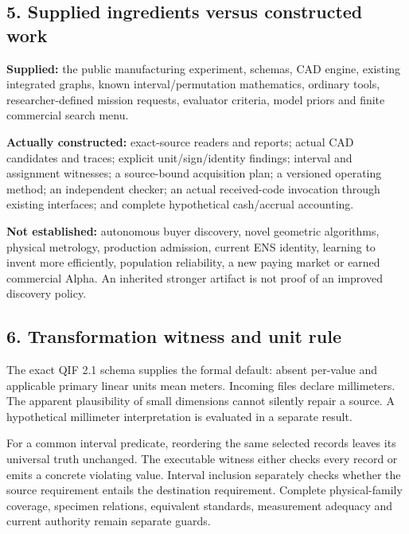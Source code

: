 \documentclass[
  10pt,
]{article}
\let\OriginalSubsection\subsection
\renewcommand{\subsection}{\needspace{6\baselineskip}\OriginalSubsection}
\begin{document}
\hypertarget{supplied-ingredients-versus-constructed-work}{%
\subsection{5. Supplied ingredients versus constructed
work}\label{supplied-ingredients-versus-constructed-work}}

\textbf{Supplied:} the public manufacturing experiment, schemas, CAD
engine, existing integrated graphs, known interval/permutation
mathematics, ordinary tools, researcher-defined mission requests,
evaluator criteria, model priors and finite commercial search menu.

\textbf{Actually constructed:} exact-source readers and reports; actual
CAD candidates and traces; explicit unit/sign/identity findings;
interval and assignment witnesses; a source-bound acquisition plan; a
versioned operating method; an independent checker; an actual
received-code invocation through existing interfaces; and complete
hypothetical cash/accrual accounting.

\textbf{Not established:} autonomous buyer discovery, novel geometric
algorithms, physical metrology, production admission, current ENS
identity, learning to invent more efficiently, population reliability, a
new paying market or earned commercial Alpha. An inherited stronger
artifact is not proof of an improved discovery policy.

\hypertarget{transformation-witness-and-unit-rule}{%
\subsection{6. Transformation witness and unit
rule}\label{transformation-witness-and-unit-rule}}

The exact QIF 2.1 schema supplies the formal default: absent per-value
and applicable primary linear units mean meters. Incoming files declare
millimeters. The apparent plausibility of small dimensions cannot
silently repair a source. A hypothetical millimeter interpretation is
evaluated in a separate result.

For a common interval predicate, reordering the same selected records
leaves its universal truth unchanged. The executable witness either
checks every record or emits a concrete violating value. Interval
inclusion separately checks whether the source requirement entails the
destination requirement. Complete physical-family coverage, specimen
relations, equivalent standards, measurement adequacy and current
authority remain separate guards.
\end{document}

